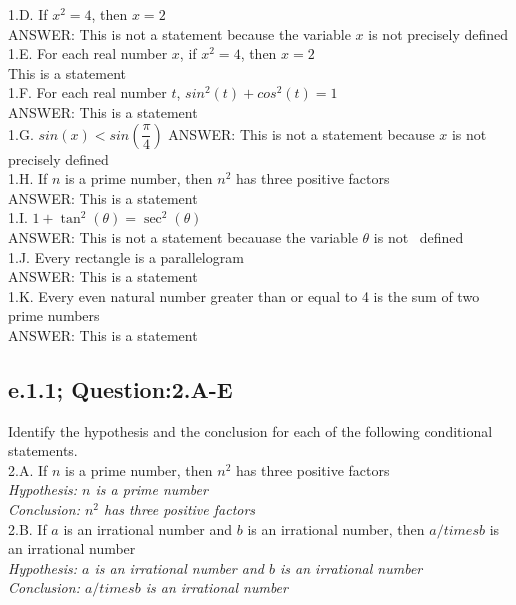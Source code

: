 1.D. If $x^2=4$, then $x=2$ \\
	ANSWER: This is not a statement because the variable $x$ is not precisely defined \\

1.E. For each real number $x$, if $x^2=4$, then $x=2$ \\
	This is a statement \\

1.F. For each real number $t$, $sin^2(t) + cos^2(t) = 1$ \\
	ANSWER: This is a statement \\
1.G. $sin(x) < sin(\dfrac{\pi}{4})$ 
	ANSWER: This is not a statement because $x$ is not precisely defined \\
	
1.H. If $n$ is a prime number, then $n^2$ has three positive factors \\
	ANSWER: This is a statement\\
	
1.I. $1 + \tan^2(\theta) = \sec^2(\theta)$ \\
	ANSWER: This is not a statement becauase the variable $\theta$ is not \ defined \\
	
1.J. Every rectangle is a parallelogram \\
	ANSWER: This is a statement \\

1.K. Every even natural number greater than or equal to 4 is the sum of two prime numbers \\ 
	ANSWER: This is a statement \\

\subsection{e.1.1; Question:2.A-E}

Identify the hypothesis and the conclusion for each of the following conditional statements. \\

2.A. If $n$ is a prime number, then $n^2$ has three positive factors \\
	{\it Hypothesis: $n$ is a prime number} \\
	{\it Conclusion: $n^2$ has three positive factors} \\ 

2.B. If $a$ is an irrational number and $b$ is an irrational number, then $a /times b$ is an irrational number \\
	{\it Hypothesis: $a$ is an irrational number and $b$ is an irrational number} \\
	{\it Conclusion: $a /times b$ is an irrational number} \\

